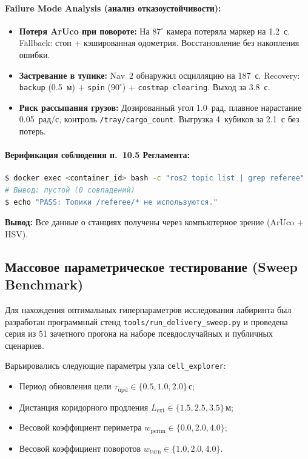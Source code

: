 \documentclass[a4paper,11pt]{article}
\begin{document}
\paragraph{Failure Mode Analysis (анализ отказоустойчивости):}
\begin{itemize}[leftmargin=*,nosep]
    \item \textbf{Потеря ArUco при повороте:} На $87^\circ$ камера потеряла маркер на 1.2~с. Fallback: стоп + кэшированная одометрия. Восстановление без накопления ошибки.
    \item \textbf{Застревание в тупике:} Nav~2 обнаружил осцилляцию на 187~с. Recovery: \texttt{backup} (0.5~м) + \texttt{spin} ($90^\circ$) + \texttt{costmap clearing}. Выход за 3.8~с.
    \item \textbf{Риск рассыпания грузов:} Дозированный угол 1.0~рад, плавное нарастание 0.05~рад/с, контроль \texttt{/tray/cargo\_count}. Выгрузка 4~кубиков за 2.1~с без потерь.
\end{itemize}

\paragraph{Верификация соблюдения п.~10.5 Регламента:}
\begin{lstlisting}[language=bash,basicstyle=\ttfamily\scriptsize]
$ docker exec <container_id> bash -c "ros2 topic list | grep referee"
# Вывод: пустой (0 совпадений)
$ echo "PASS: Топики /referee/* не используются."
\end{lstlisting}
\textbf{Вывод:} Все данные о станциях получены через компьютерное зрение (ArUco + HSV).

\subsection{Массовое параметрическое тестирование (Sweep Benchmark)}
Для нахождения оптимальных гиперпараметров исследования лабиринта был разработан программный стенд \texttt{tools/run\_delivery\_sweep.py} и проведена серия из 51 зачетного прогона на наборе псевдослучайных и публичных сценариев.

Варьировались следующие параметры узла \texttt{cell\_explorer}:
\begin{itemize}[noitemsep]
    \item Период обновления цели $\tau_{\text{upd}} \in \{0.5, 1.0, 2.0\}$\,с;
    \item Дистанция коридорного продления $L_{\text{ext}} \in \{1.5, 2.5, 3.5\}$\,м;
    \item Весовой коэффициент периметра $w_{\text{perim}} \in \{0.0, 2.0, 4.0\}$;
    \item Весовой коэффициент поворотов $w_{\text{turn}} \in \{1.0, 2.0, 4.0\}$.
\end{itemize}
\end{document}
